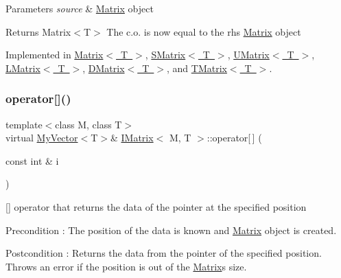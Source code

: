 \begin{DoxyParams}{Parameters}
{\em source} & \mbox{\hyperlink{class_matrix}{Matrix}} object \\
\hline
\end{DoxyParams}
\begin{DoxyReturn}{Returns}
Matrix$<$\+T$>$ The c.\+o. is now equal to the rhs \mbox{\hyperlink{class_matrix}{Matrix}} object 
\end{DoxyReturn}


Implemented in \mbox{\hyperlink{class_matrix_a33c00fb6f2e9401d17d9ed615b965634}{Matrix$<$ T $>$}}, \mbox{\hyperlink{class_s_matrix_a8cd6e37560a4cb9fd35e9120ed680135}{S\+Matrix$<$ T $>$}}, \mbox{\hyperlink{class_u_matrix_a3f12f4544a460dd93dac8a883654310f}{U\+Matrix$<$ T $>$}}, \mbox{\hyperlink{class_l_matrix_ad4feb8e3706e9ce8fdb07e63d985f52f}{L\+Matrix$<$ T $>$}}, \mbox{\hyperlink{class_d_matrix_a36f86365c4ee760200acc4abfc5b27f2}{D\+Matrix$<$ T $>$}}, and \mbox{\hyperlink{class_t_matrix_a47aaa864a06bdc4c24608b33a353f873}{T\+Matrix$<$ T $>$}}.

\mbox{\label{class_i_matrix_a3cfb2490e2849c6c19c1979066a64818}} 
\subsubsection{\texorpdfstring{operator[]()}{operator[]()}\hspace{0.1cm}{\footnotesize\ttfamily [1/2]}}
{\footnotesize\ttfamily template$<$class M, class T$>$ \\
virtual \mbox{\hyperlink{class_my_vector}{My\+Vector}}$<$T$>$\& \mbox{\hyperlink{class_i_matrix}{I\+Matrix}}$<$ M, T $>$\+::operator\mbox{[}$\,$\mbox{]} (\begin{DoxyParamCaption}\item[{const int \&}]{i }\end{DoxyParamCaption})\hspace{0.3cm}{\ttfamily [pure virtual]}}



\mbox{[}\mbox{]} operator that returns the data of the pointer at the specified position 

\begin{DoxyPrecond}{Precondition}
\+: The position of the data is known and \mbox{\hyperlink{class_matrix}{Matrix}} object is created. 
\end{DoxyPrecond}
\begin{DoxyPostcond}{Postcondition}
\+: Returns the data from the pointer of the specified position. Throws an error if the position is out of the \mbox{\hyperlink{class_matrix}{Matrix}}\textquotesingle{}s size. 
\end{DoxyPostcond}

